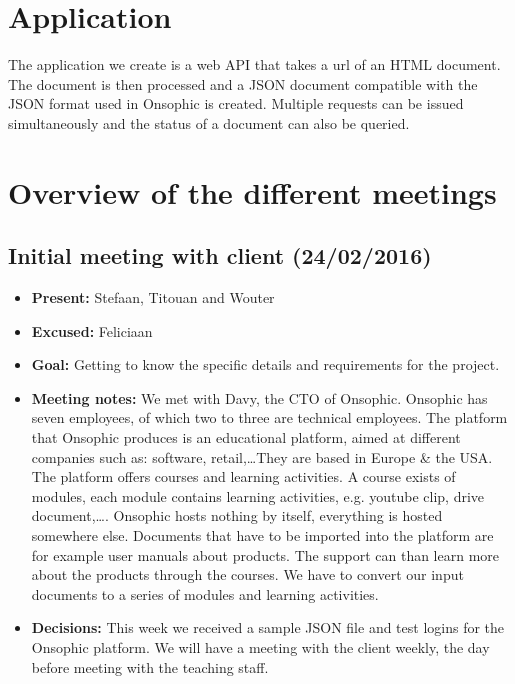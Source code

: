 \documentclass[a4paper,12pt]{article}
\begin{document}
\section{Application}
The application we create is a web API that takes a url of an HTML document. The document is then processed and a JSON document compatible with the JSON format used in Onsophic is created. Multiple requests can be issued simultaneously and the status of a document can also be queried.
\section{Overview of the different meetings}
\subsection{Initial meeting with client (24/02/2016)}
\begin{itemize}
\item \textbf{Present:} Stefaan, Titouan and Wouter
\item \textbf{Excused:} Feliciaan
\item \textbf{Goal:} Getting to know the specific details and requirements for the project.
\item \textbf{Meeting notes:} We met with Davy, the CTO of Onsophic. Onsophic has  seven employees, of which two to three are technical employees. The platform that Onsophic produces is an educational platform, aimed at different companies such as: software, retail,\ldots They are based in Europe \& the USA.\\
The platform offers courses and learning activities. A course exists of modules, each module contains learning activities, e.g. youtube clip, drive document,\ldots. Onsophic hosts nothing by itself, everything is hosted somewhere else.
Documents that have to be imported into the platform are for example user manuals about products. The support can than learn more about the products through the courses. We have to convert our input documents to a series of modules and learning activities.
\item \textbf{Decisions:} This week we received a sample JSON file and test logins for the Onsophic platform. We will have a meeting with the client weekly, the day before meeting with the teaching staff.
\end{itemize}
\end{document}
